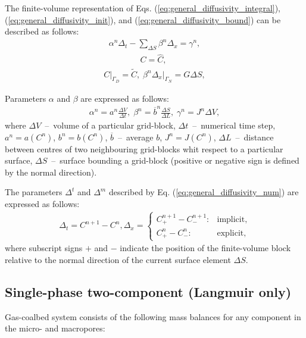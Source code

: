 \documentclass[a4paper,14pt,english]{extreport}
\begin{document}
The finite-volume representation of Eqs. (\ref{eq:general_diffusivity_integral}), (\ref{eq:general_diffusivity_init}), and (\ref{eq:general_diffusivity_bound}) can be described as follows:
    \begin{eqnarray}
        \label{eq:general_diffusivity_num}
        \alpha^n \Delta_{t} - \sum_{\Delta S} \beta^n\Delta_{x} = \gamma^n,
    \end{eqnarray}
    \begin{eqnarray}
         \label{eq:general_diffusivity_num_init}
        C = \hat{C}, \; 
    \end{eqnarray}
    \begin{eqnarray}
    \label{eq:general_diffusivity_num_bound}
    C \Big|_{\mathit{\Gamma}_D}= \tilde{C}, \; \beta^n\Delta_x \Big|_{\mathit{\Gamma}_N} = G\Delta S,
    \end{eqnarray}

Parameters $\alpha$ and $\beta$ are expressed as follows:
    \begin{eqnarray}
        \label{eq:general_alpha_beta_gamma}
        \alpha^n = a^n\frac{\Delta V}{\Delta t}, \;
        \beta^n = \overline{b}^n\frac{\Delta S}{\Delta L}, \; \gamma^n = J^n \Delta V,
    \end{eqnarray}
where $\Delta V$~--~volume of a particular grid-block, $\Delta t$~--~numerical time step, $a^n = a\left(C^n\right)$, $b^n = b\left(C^n\right)$, $\overline{b}$~--~average $b$, $J^n=J\left(C^n\right)$, $\Delta L$~--~distance between centres of two neighbouring grid-blocks whit respect to a particular surface, $\Delta S$~--~surface bounding a grid-block (positive or negative sign is defined by the normal direction).

The parameters $\Delta^{t}$ and $\Delta^{m}$ described by Eq. (\ref{eq:general_diffusivity_num}) are expressed as follows:
    \begin{eqnarray}
    \label{eq:general_delta_num}
    \Delta_t = C^{n+\mathit{1}} - C^{n}, \Delta_x = \begin{cases}
    C_{+}^{n+\mathit{1}} - C_{-}^{n+\mathit{1}} : &\text{implicit},\\
        C_{+}^{n} - C_{-}^{n} : &\text{explicit},
    \end{cases}
    \end{eqnarray}
where subscript signs $+$ and $-$ indicate the position of the finite-volume block relative to the normal direction of the current surface element $\Delta S$.

 \subsection*{Single-phase two-component (Langmuir only)}
Gas-coalbed system consists of the following mass balances for any component in the micro- and macropores:
\end{document}
